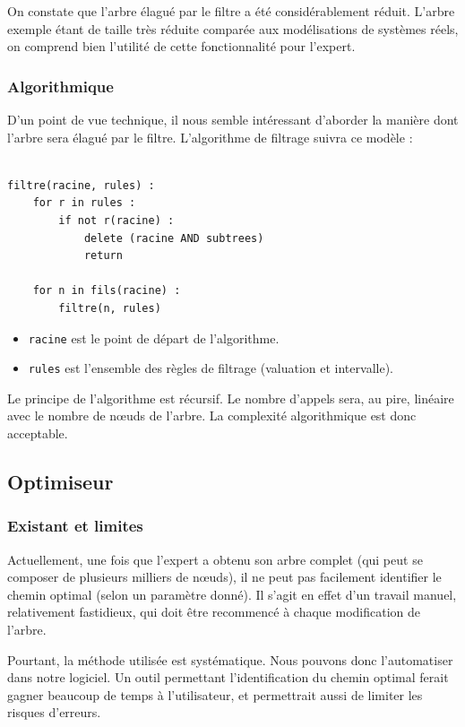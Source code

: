 			On constate que l'arbre élagué par le filtre a été considérablement réduit. L'arbre exemple étant de taille très réduite comparée aux modélisations de systèmes réels, on comprend bien l'utilité de cette fonctionnalité pour l'expert.

		\subsubsection{Algorithmique}
			D'un point de vue technique, il nous semble intéressant d'aborder la manière dont l'arbre sera élagué par le filtre.
			L'algorithme de filtrage suivra ce modèle :

		\begin{lstlisting}

filtre(racine, rules) :
	for r in rules :
		if not r(racine) :
			delete (racine AND subtrees)
			return

	for n in fils(racine) :
		filtre(n, rules)

		\end{lstlisting}

		\begin{itemize}
			\item \verb|racine| est le point de départ de l'algorithme.
			\item \verb|rules| est l'ensemble des règles de filtrage (valuation et intervalle).
		\end{itemize}
		
			Le principe de l'algorithme est récursif.
			Le nombre d'appels sera, au pire, linéaire avec le nombre de nœuds de l'arbre.
			La complexité algorithmique est donc acceptable.

	\subsection{Optimiseur}
		\subsubsection{Existant et limites}
			Actuellement, une fois que l'expert a obtenu son arbre complet (qui peut se composer de plusieurs milliers de nœuds), il ne peut pas facilement identifier le chemin optimal (selon un paramètre donné).
			Il s'agit en effet d'un travail manuel, relativement fastidieux, qui doit être recommencé à chaque modification de l'arbre.
			
			Pourtant, la méthode utilisée est systématique. Nous pouvons donc l'automatiser dans notre logiciel. Un outil permettant l'identification du chemin optimal ferait gagner beaucoup de temps à l'utilisateur, et permettrait aussi de limiter les risques d'erreurs.
		
